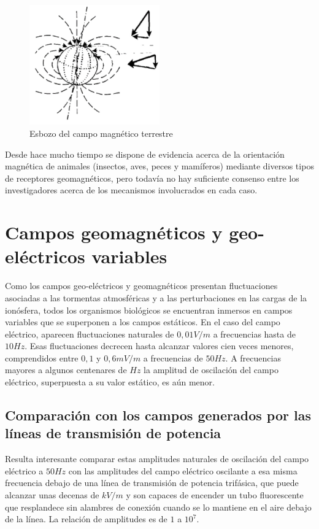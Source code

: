 \begin{figure}[H]
    \centering
    \includegraphics[width=0.5\textwidth]{./Figures/fig63}
	\caption{Esbozo del campo magnético terrestre}
	\label{fig:63}
\end{figure}

Desde hace mucho tiempo se dispone de evidencia acerca de la orientación magnética de animales (insectos, aves, peces y mamíferos) mediante diversos tipos de receptores geomagnéticos, pero todavía no hay suficiente consenso entre los investigadores acerca de los mecanismos involucrados en cada caso.

\section{Campos geomagnéticos y geo-eléctricos variables}

Como los campos geo-eléctricos y geomagnéticos presentan fluctuaciones asociadas a las tormentas atmosféricas y a las perturbaciones en las cargas de la ionósfera, todos los organismos biológicos se encuentran inmersos en campos variables que se superponen a los campos estáticos.
En el caso del campo eléctrico, aparecen fluctuaciones naturales de $0,01 V/m$ a frecuencias hasta de $10 Hz$.
Esas fluctuaciones decrecen hasta alcanzar valores cien veces menores, comprendidos entre $0,1$ y $0,6 mV/m$ a frecuencias de $50 Hz$.
A frecuencias mayores a algunos centenares de $Hz$ la amplitud de oscilación del campo eléctrico, superpuesta a su valor estático, es aún menor.

\subsection{Comparación con los campos generados por las líneas de transmisión de potencia}

Resulta interesante comparar estas amplitudes naturales de oscilación del campo eléctrico a $50 Hz$ con las amplitudes del campo eléctrico oscilante a esa misma frecuencia debajo de una línea de transmisión de potencia trifásica, que puede alcanzar unas decenas de $kV/m$ y son capaces de encender un tubo fluorescente que resplandece sin alambres de conexión cuando se lo mantiene en el aire debajo de la línea. La relación de amplitudes es de $1$ a $10^{7}$.

